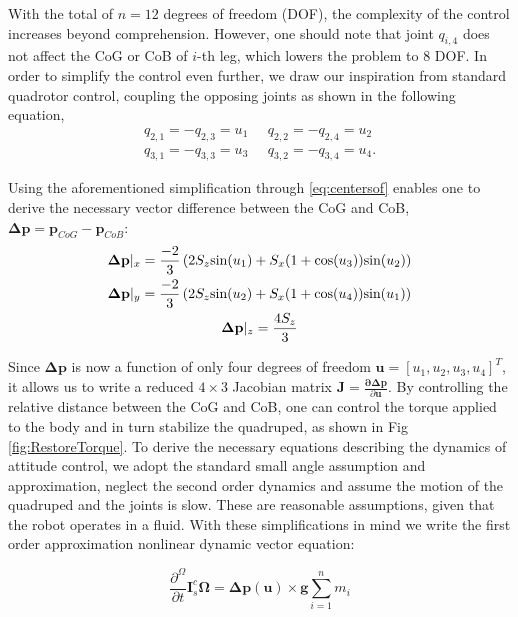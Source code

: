 With the total of $n=12$ degrees of freedom (DOF), the complexity of the control increases beyond comprehension. However, one should note that joint $q_{i,4}$ does not affect the CoG or CoB of $i$-th leg, which lowers the problem to 8 DOF. In order to simplify the control even further, we draw our inspiration from standard quadrotor control, coupling the opposing joints as shown in the following equation,
\begin{gather}
q_{2,1}=-q_{2,3} = u_1 \;\;\;\;\;
q_{2,2}=-q_{2,4} = u_2  \\ \nonumber
q_{3,1}=-q_{3,3} = u_3 \;\;\;\;\;
q_{3,2}=-q_{3,4} = u_4. 
\end{gather}

Using the aforementioned simplification through \eqref{eq:centersof} enables one to derive the necessary vector difference between the CoG and CoB, $\boldsymbol{\Delta}\textbf{p} = \textbf{p}_{CoG}-\textbf{p}_{CoB}$:
\begin{gather}
\boldsymbol{\Delta}\textbf{p}|_x = \frac{-2}{3}\left( 2 S_z \textup{sin}(u_1)+S_x (1+\textup{cos}(u_3))\textup{sin}(u_2) \right )\\ \nonumber
\boldsymbol{\Delta}\textbf{p}|_y = \frac{-2}{3}\left( 2 S_z \textup{sin}(u_2)+S_x (1+\textup{cos}(u_4))\textup{sin}(u_1) \right )\\ \nonumber
\boldsymbol{\Delta}\textbf{p}|_z = \frac{4 S_z}{3} 
\end{gather}

Since $\boldsymbol{\Delta}\textbf{p}$ is now a function of only four degrees of freedom $\textbf{u}=[u_1,u_2,u_3, u_4]^T$, it allows us to write a reduced $4 \times 3$ Jacobian matrix $\textbf{J}=\frac{\boldsymbol{\partial \Delta}\textbf{p}}{\partial \textbf{u}}$. By controlling the relative distance between the CoG and CoB, one can control the torque applied to the body and in turn stabilize the quadruped, as shown in Fig \ref{fig:RestoreTorque}. To derive the necessary equations describing the dynamics of attitude control, we adopt the standard small angle assumption and approximation, neglect the second order dynamics and assume the motion of the quadruped and the joints is slow. These are reasonable assumptions, given that the robot operates in a fluid. With these simplifications in mind we write the first order approximation nonlinear dynamic vector equation:

\begin{equation}\label{eq:finalDyn}
\frac{\partial^\Omega}{\partial t}\textbf{I}_s^c\boldsymbol{\Omega}  = {\boldsymbol{\Delta}\textbf{p}}(\textbf{u}) \times \textbf{g}{\sum_{i=1}^n m_i } 
\end{equation}


